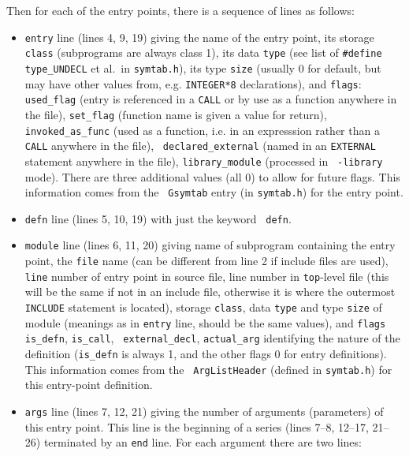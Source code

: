 \documentclass{article}
\begin{document}
Then for each of the entry points, there is a sequence of lines as
follows:
\begin{itemize}
  \item {\tt entry} line (lines 4, 9, 19) giving the name of the entry
     point, its storage {\tt class} (subprograms are always class 1),
     its data {\tt type} (see list of {\tt \#define type\_UNDECL} et
     al.\ in {\tt symtab.h}), its type {\tt size} (usually 0 for
     default, but may have other values from, e.g. {\tt INTEGER*8}
     declarations), and {\tt flags}: {\tt used\_flag} (entry is
     referenced in a {\tt CALL} or by use as a function anywhere in
     the file), {\tt set\_flag} (function name is given a value for
     return), {\tt invoked\_as\_func} (used as a function, i.e. in an
     expresssion rather than a {\tt CALL} anywhere in the file), {\tt
     declared\_external} (named in an {\tt EXTERNAL} statement
     anywhere in the file), {\tt library\_module} (processed in {\tt
     -library} mode).  There are three additional values (all 0) to
     allow for future flags.  This information comes from the {\tt
     Gsymtab} entry (in {\tt symtab.h}) for the entry point.

  \item {\tt defn} line (lines 5, 10, 19) with just the keyword {\tt
  defn}.

  \item {\tt module} line (lines 6, 11, 20) giving name of subprogram
     containing the entry point, the {\tt file} name (can be different from
     line 2 if include files are used), {\tt line} number of entry point in
     source file, line number in {\tt top}-level file (this will be the same
     if not in an include file, otherwise it is where the outermost
     {\tt INCLUDE} statement is located), storage {\tt class}, data
     {\tt type} and type {\tt size} of
     module (meanings as in {\tt entry} line, should be the same
     values), and {\tt flags} {\tt is\_defn}, {\tt is\_call}, {\tt
     external\_decl}, {\tt actual\_arg} identifying the nature of the
     definition ({\tt is\_defn} is always 1, and the other flags 0 for
     entry definitions).  This information comes from the {\tt
     ArgListHeader} (defined in {\tt symtab.h}) for this entry-point
     definition.

  \item {\tt args} line (lines 7, 12, 21) giving the number of
     arguments (parameters) of this entry point.  This line is the
     beginning of a series (lines 7--8, 12--17, 21--26) terminated by
     an {\tt end} line.  For each argument there are two lines:


\end{itemize}
\end{document}
